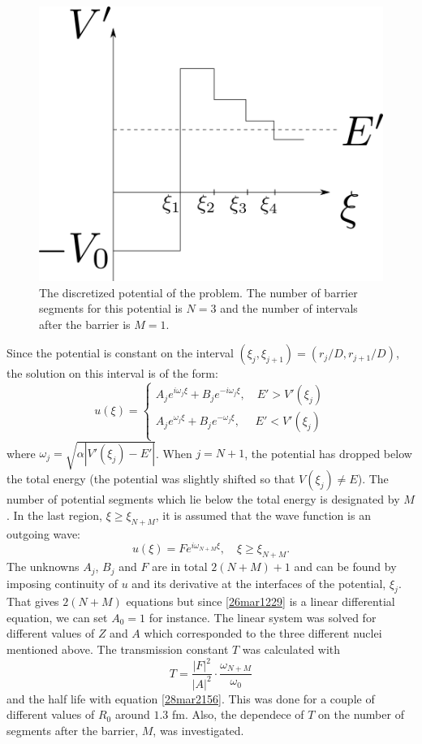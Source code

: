 \documentclass[twocolumn]{article}
\begin{document}
\begin{large}
\begin{figure}[t]
    \centering
    \includegraphics[scale=0.5]{setup.png}
    \caption{The discretized potential of the problem. The number of barrier segments for this potential is $N=3$ and the number of intervals after the barrier is $M=1$.}
    \label{28mar2237}
\end{figure}
Since the potential is constant on the interval $(\xi_j,\xi_{j+1}) = (r_j/D,r_{j+1}/D)$, the solution on this interval is of the form:
\begin{equation*}
    u(\xi) = 
    \begin{cases}
        A_je^{i\omega_j\xi}+B_je^{-i\omega_j\xi},\quad E'>V'(\xi_j) \\ 
        A_je^{\omega_j\xi}+B_je^{-\omega_j\xi},\quad\,\, E'<V'(\xi_j) \\ 
    \end{cases}
\end{equation*}
where $\omega_j = \sqrt{\alpha|V'(\xi_j)-E'|}$. When $j=N+1$, the potential has dropped below the total energy (the potential was slightly shifted so that $V(\xi_j)\neq E$). The number of potential segments which lie below the total energy is designated by $M$. In the last region, $\xi\geq\xi_{N+M}$, it is assumed that the wave function is an outgoing wave:
\begin{equation*}
    u(\xi) = Fe^{i\omega_{N+M}\xi},\quad \xi\geq \xi_{N+M}.
\end{equation*}
The unknowns $A_j$, $B_j$ and $F$ are in total $2(N+M)+1$ and can be found by imposing continuity of $u$ and its derivative at the interfaces of the potential, $\xi_j$. That gives $2(N+M)$ equations but since \eqref{26mar1229} is a linear differential equation, we can set $A_0 = 1$ for instance. The linear system was solved for different values of $Z$ and $A$ which corresponded to the three different nuclei mentioned above. The transmission constant $T$ was calculated with 
\begin{equation}
    T = \frac{|F|^2}{|A|^2}\cdot\frac{\omega_{N+M}}{\omega_0}
\end{equation}
and the half life with equation \eqref{28mar2156}. This was done for a couple of  different values of $R_0$ around $1.3$ fm. Also, the dependece of $T$ on the number of segments after the barrier, $M$, was investigated. 

\end{large}
\end{document}
